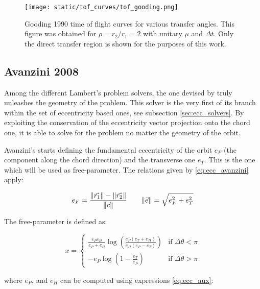 \vspace{0.5cm}
\begin{figure}[h]
  \centering
  \texttt{[image: static/tof\_curves/tof\_gooding.png]}
  \caption[Gooding 1990 time of flight curves]{Gooding 1990 time of flight curves for various transfer angles. This
    figure was obtained for $\rho=r_2/r_1=2$ with unitary $\mu$ and $\Delta t$.
    Only the direct transfer region is shown for the purposes of this work.}
  \label{fig:tof_gooding}
\end{figure}


\subsection{Avanzini 2008}

Among the different Lambert's problem solvers, the one devised by
\cite{avanzini2008} truly unleashes the geometry of the problem. This solver is
the very first of its branch within the set of eccentricity based ones, see
subsection \ref{sec:ecc_solvers}. By exploiting the conservation of the
eccentricity vector projection onto the chord one, it is able to solve for the
problem no matter the geometry of the orbit.

Avanzini's starts defining the fundamental eccentricity of the orbit $e_F$ (the
component along the chord direction) and the transverse one $e_T$. This is the
one which will be used as free-parameter. The relations given by
\ref{eq:ecc_avanzini} apply:

\begin{equation}
  e_F = \frac{\lVert\vec{r_1}\rVert - \lVert\vec{r_2}\rVert}{\lVert\vec{c}\rVert}\quad\quad
  \lVert\vec{e}\rVert = \sqrt{e_F^2 + e_T^2}
  \label{eq:ecc_avanzini}
\end{equation}

The free-parameter is defined as:

\begin{equation}
  x =
  \begin{cases}
    \frac{e_P e_H}{e_P + e_H}\log{\left(\frac{e_P(e_T + e_H)}{e_H(e_P - e_T)}\right)} & \text{if $\Delta \theta < \pi$} \\
    -e_P \log{\left(1 - \frac{e_T}{e_P} \right)}                                      & \text{if $\Delta \theta > \pi$}
  \end{cases}
\end{equation}

where $e_P$, and $e_H$ can be computed using expressions \ref{eq:ecc_aux}:

